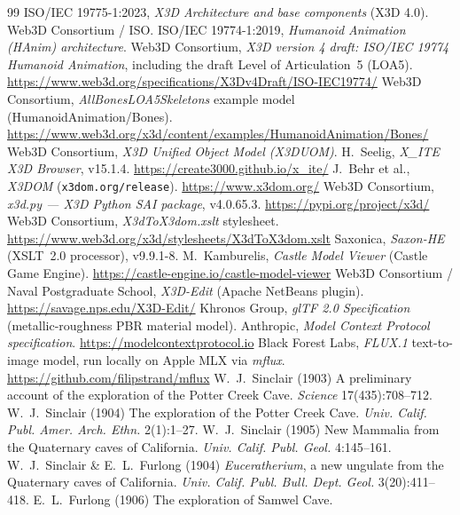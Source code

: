 \documentclass[11pt]{article}
\newcommand{\xite}{X\_ITE}
\begin{document}
\begin{thebibliography}{99}
\small
{} ISO/IEC 19775-1:2023, \emph{X3D Architecture and base components}
(X3D 4.0). Web3D Consortium / ISO.
 ISO/IEC 19774-1:2019, \emph{Humanoid Animation (HAnim)
architecture}.
 Web3D Consortium, \emph{X3D version 4 draft: ISO/IEC 19774
Humanoid Animation}, including the draft Level of Articulation~5 (LOA5).
\url{https://www.web3d.org/specifications/X3Dv4Draft/ISO-IEC19774/}
 Web3D Consortium, \emph{AllBonesLOA5Skeletons} example model
(HumanoidAnimation/Bones).
\url{https://www.web3d.org/x3d/content/examples/HumanoidAnimation/Bones/}
 Web3D Consortium, \emph{X3D Unified Object Model (X3DUOM)}.
 H.~Seelig, \emph{\xite{} X3D Browser}, v15.1.4.
\url{https://create3000.github.io/x_ite/}
 J.~Behr et al., \emph{X3DOM} (\texttt{x3dom.org/release}).
\url{https://www.x3dom.org/}
 Web3D Consortium, \emph{x3d.py --- X3D Python SAI package},
v4.0.65.3. \url{https://pypi.org/project/x3d/}
 Web3D Consortium, \emph{X3dToX3dom.xslt} stylesheet.
\url{https://www.web3d.org/x3d/stylesheets/X3dToX3dom.xslt}
 Saxonica, \emph{Saxon-HE} (XSLT~2.0 processor), v9.9.1-8.
 M.~Kambur\-elis, \emph{Castle Model Viewer} (Castle Game Engine).
\url{https://castle-engine.io/castle-model-viewer}
 Web3D Consortium / Naval Postgraduate School, \emph{X3D-Edit}
(Apache NetBeans plugin). \url{https://savage.nps.edu/X3D-Edit/}
 Khronos Group, \emph{glTF 2.0 Specification} (metallic-roughness
PBR material model).
 Anthropic, \emph{Model Context Protocol specification}.
\url{https://modelcontextprotocol.io}
 Black Forest Labs, \emph{FLUX.1} text-to-image model, run locally
on Apple MLX via \emph{mflux}. \url{https://github.com/filipstrand/mflux}
 W.~J.~Sinclair (1903) A preliminary account of the
exploration of the Potter Creek Cave. \emph{Science} 17(435):708--712.
 W.~J.~Sinclair (1904) The exploration of the Potter Creek
Cave. \emph{Univ. Calif. Publ. Amer. Arch. Ethn.} 2(1):1--27.
 W.~J.~Sinclair (1905) New Mammalia from the Quaternary caves
of California. \emph{Univ. Calif. Publ. Geol.} 4:145--161.
 W.~J.~Sinclair \& E.~L.~Furlong (1904) \emph{Euceratherium}, a new
ungulate from the Quaternary caves of California. \emph{Univ. Calif. Publ. Bull.
Dept. Geol.} 3(20):411--418.
 E.~L.~Furlong (1906) The exploration of Samwel Cave.

\end{thebibliography}
\end{document}
